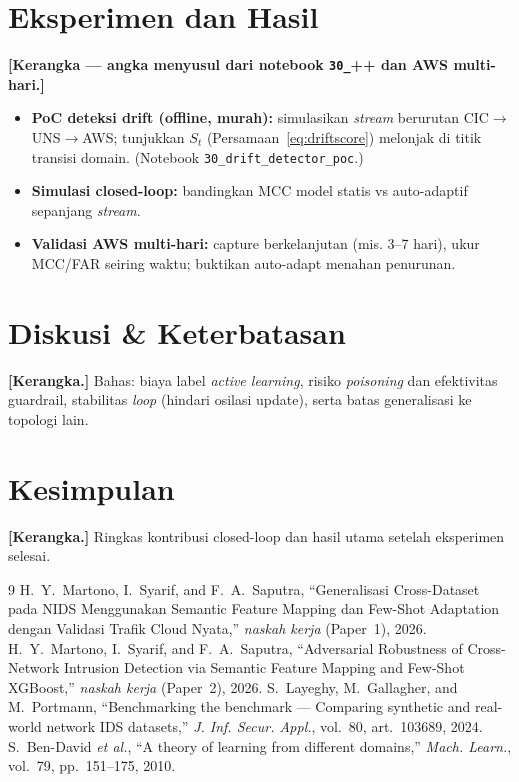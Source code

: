 \documentclass[11pt,a4paper]{article}
\begin{document}
\section{Eksperimen dan Hasil}
\label{sec:eval}
\textbf{[Kerangka — angka menyusul dari notebook \texttt{30\_}++ dan AWS multi-hari.]}
\begin{itemize}
  \item \textbf{PoC deteksi drift (offline, murah):} simulasikan \emph{stream}
  berurutan CIC$\rightarrow$UNS$\rightarrow$AWS; tunjukkan $S_t$ (Persamaan~\ref{eq:driftscore})
  melonjak di titik transisi domain. (Notebook \texttt{30\_drift\_detector\_poc}.)
  \item \textbf{Simulasi closed-loop:} bandingkan MCC model statis vs
  auto-adaptif sepanjang \emph{stream}.
  \item \textbf{Validasi AWS multi-hari:} capture berkelanjutan (mis. 3--7 hari),
  ukur MCC/FAR seiring waktu; buktikan auto-adapt menahan penurunan.
\end{itemize}

\section{Diskusi \& Keterbatasan}
\label{sec:discussion}
\textbf{[Kerangka.]} Bahas: biaya label \emph{active learning}, risiko
\emph{poisoning} dan efektivitas guardrail, stabilitas \emph{loop} (hindari
osilasi update), serta batas generalisasi ke topologi lain.

\section{Kesimpulan}
\label{sec:conclusion}
\textbf{[Kerangka.]} Ringkas kontribusi closed-loop dan hasil utama setelah
eksperimen selesai.

\begin{thebibliography}{9}
 H.~Y.~Martono, I.~Syarif, and F.~A.~Saputra, ``Generalisasi
Cross-Dataset pada NIDS Menggunakan Semantic Feature Mapping dan Few-Shot
Adaptation dengan Validasi Trafik Cloud Nyata,'' \emph{naskah kerja} (Paper~1),
2026.
 H.~Y.~Martono, I.~Syarif, and F.~A.~Saputra, ``Adversarial
Robustness of Cross-Network Intrusion Detection via Semantic Feature Mapping and
Few-Shot XGBoost,'' \emph{naskah kerja} (Paper~2), 2026.
 S.~Layeghy, M.~Gallagher, and M.~Portmann, ``Benchmarking the
benchmark --- Comparing synthetic and real-world network IDS datasets,''
\emph{J. Inf. Secur. Appl.}, vol.~80, art.~103689, 2024.
 S.~Ben-David \emph{et al.}, ``A theory of learning from
different domains,'' \emph{Mach. Learn.}, vol.~79, pp.~151--175, 2010.
\end{thebibliography}
\end{document}
